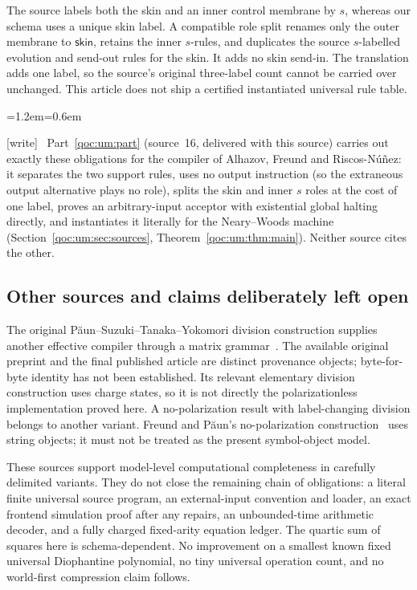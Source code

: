 \documentclass[11pt,letterpaper]{article}
\theoremstyle{definition}
\theoremstyle{remark}
\newcommand{\sk}{\mathsf{skin}}
\newcommand{\wtag}{\textup{[write]}}
\newenvironment{writenote}{\par\smallskip\begin{list}{}{\leftmargin=1.2em\rightmargin=0.6em}\item[]\small\wtag\ }{\end{list}\smallskip}
\begin{document}
The source labels both the skin and an inner control membrane by $s$, whereas our schema uses a unique skin label. A compatible role split renames only the outer membrane to $\sk$, retains the inner $s$-rules, and duplicates the source $s$-labelled evolution and send-out rules for the skin. It adds no skin send-in. The translation adds one label, so the source's original three-label count cannot be carried over unchanged. This article does not ship a certified instantiated universal rule table.

\begin{writenote}
Part~\ref{qoc:um:part} (source~16, delivered with this source) carries out exactly these obligations for the compiler of Alhazov, Freund and Riscos-N\'u\~nez: it separates the two support rules, uses no output instruction (so the extraneous output alternative plays no role), splits the skin and inner $s$ roles at the cost of one label, proves an arbitrary-input acceptor with existential global halting directly, and instantiates it literally for the Neary--Woods machine (Section~\ref{qoc:um:sec:sources}, Theorem~\ref{qoc:um:thm:main}). Neither source cites the other.
\end{writenote}


\subsection{Other sources and claims deliberately left open}
The original P\u aun--Suzuki--Tanaka--Yokomori division construction supplies another effective compiler through a matrix grammar~\cite{mm:paun}. The available original preprint and the final published article are distinct provenance objects; byte-for-byte identity has not been established. Its relevant elementary division construction uses charge states, so it is not directly the polarizationless implementation proved here. A no-polarization result with label-changing division belongs to another variant. Freund and P\u aun's no-polarization construction~\cite{mm:freund} uses string objects; it must not be treated as the present symbol-object model.

These sources support model-level computational completeness in carefully delimited variants. They do not close the remaining chain of obligations: a literal finite universal source program, an external-input convention and loader, an exact frontend simulation proof after any repairs, an unbounded-time arithmetic decoder, and a fully charged fixed-arity equation ledger. The quartic sum of squares here is schema-dependent. No improvement on a smallest known fixed universal Diophantine polynomial, no tiny universal operation count, and no world-first compression claim follows.
\end{document}
